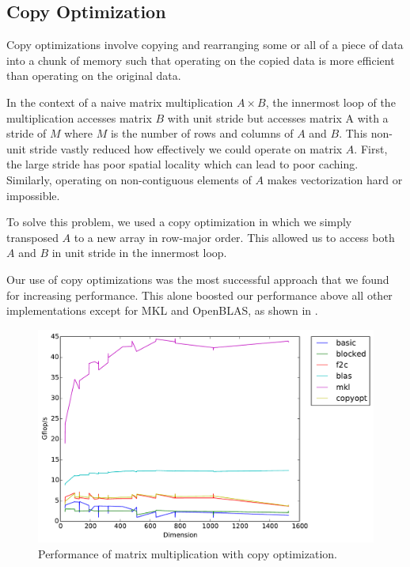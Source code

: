 \subsection{Copy Optimization}
Copy optimizations involve copying and rearranging some or all of a piece of
data into a chunk of memory such that operating on the copied data is more
efficient than operating on the original data.

In the context of a naive matrix multiplication $A \times B$, the innermost
loop of the multiplication accesses matrix $B$ with unit stride but accesses
matrix A with a stride of $M$ where $M$ is the number of rows and columns of
$A$ and $B$. This non-unit stride vastly reduced how effectively we could
operate on matrix $A$. First, the large stride has poor spatial locality which
can lead to poor caching. Similarly, operating on non-contiguous elements of
$A$ makes vectorization hard or impossible.

To solve this problem, we used a copy optimization in which we simply
transposed $A$ to a new array in row-major order. This allowed us to access
both $A$ and $B$ in unit stride in the innermost loop.

Our use of copy optimizations was the most successful approach that we found
for increasing performance. This alone boosted our performance above all other
implementations except for MKL and OpenBLAS, as shown in .

\begin{figure}[h]
  \centering
  \includegraphics[width=\textwidth]{timing_copyopt.pdf}
  \caption{Performance of matrix multiplication with copy optimization.}
  \label{fig:copy}
\end{figure}
